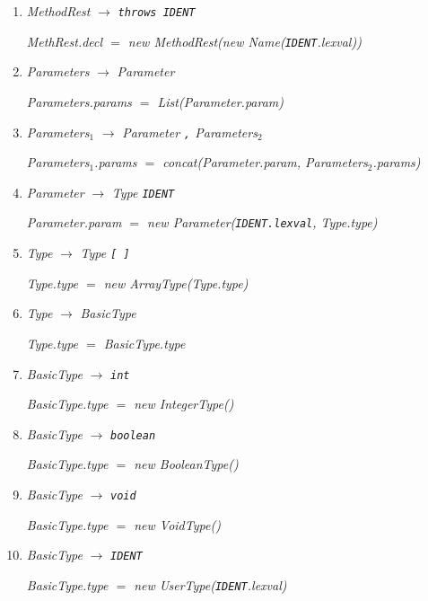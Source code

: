 \documentclass[12pt,a4paper]{scrartcl}
\renewcommand{\prod}[2]{\textit{#1} $\rightarrow$ \textit{#2}}
\newcommand{\tok}[1]{\textnormal{\texttt{#1}}}
\newcommand{\assign}[2]{\textit{#1} $=$ #2}
\newcommand{\List}[1]{\textnormal{List(\textit{#1})}}
\newcommand{\concat}[1]{\textnormal{concat(\textit{#1})}}
\newcommand{\new}[2]{\textnormal{new #1(\textit{#2})}}
\newcommand{\attr}[1]{\parbox{\linewidth}{\raggedleft \textit{#1}}}
\begin{document}
\begin{enumerate}
        \footnote{Bei optionalen Termen wird nur der Fall betrachtet, dass der Term vorhanden ist}\\
        \attr{\assign{Method.decl}{\new{DynamicMethod}{\new{Name}{\tok{IDENT}.lexval}, Type.type, Parameters.params, MethodRest.decl, Block.nodes}}}
    \item \prod{MethodRest}{\tok{throws IDENT}}\\
        \attr{\assign{MethRest.decl}{\new{MethodRest}{\new{Name}{\tok{IDENT}.lexval}}}}
    \item \prod{Parameters}{Parameter}\\
        \attr{\assign{Parameters.params}{\List{Parameter.param}}}
    \item \prod{Parameters$_1$}{Parameter \tok{,} Parameters$_2$}\\
        \attr{\assign{Parameters$_1$.params}{\concat{Parameter.param, Parameters$_2$.params}}}
    \item \prod{Parameter}{Type \tok{IDENT}}\\
        \attr{\assign{Parameter.param}{\new{Parameter}{\tok{IDENT.lexval}, Type.type}}}
    \item \prod{Type}{Type \tok{[ ]}}\\
        \attr{\assign{Type.type}{\new{ArrayType}{Type.type}}}
    \item \prod{Type}{BasicType}\\
        \attr{\assign{Type.type}{BasicType.type}}
    \item \prod{BasicType}{\tok{int}}\\
        \attr{\assign{BasicType.type}{\new{IntegerType}{}}}
    \item \prod{BasicType}{\tok{boolean}}\\
        \attr{\assign{BasicType.type}{\new{BooleanType}{}}}
    \item \prod{BasicType}{\tok{void}}\\
        \attr{\assign{BasicType.type}{\new{VoidType}{}}}
    \item \prod{BasicType}{\tok{IDENT}}\\
        \attr{\assign{BasicType.type}{\new{UserType}{\tok{IDENT}.lexval}}}


\end{enumerate}
\end{document}
